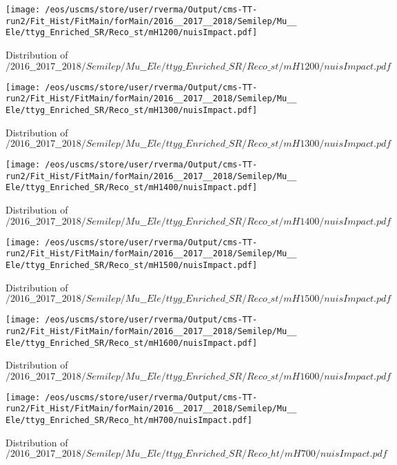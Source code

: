 \begin{figure}
\centering
\texttt{[image: /eos/uscms/store/user/rverma/Output/cms-TT-run2/Fit\_Hist/FitMain/forMain/2016\_\_2017\_\_2018/Semilep/Mu\_\_Ele/ttyg\_Enriched\_SR/Reco\_st/mH1200/nuisImpact.pdf]}
\caption{Distribution of $/2016\_\_2017\_\_2018/Semilep/Mu\_\_Ele/ttyg\_Enriched\_SR/Reco\_st/mH1200/nuisImpact.pdf$}
\end{figure}

\begin{figure}
\centering
\texttt{[image: /eos/uscms/store/user/rverma/Output/cms-TT-run2/Fit\_Hist/FitMain/forMain/2016\_\_2017\_\_2018/Semilep/Mu\_\_Ele/ttyg\_Enriched\_SR/Reco\_st/mH1300/nuisImpact.pdf]}
\caption{Distribution of $/2016\_\_2017\_\_2018/Semilep/Mu\_\_Ele/ttyg\_Enriched\_SR/Reco\_st/mH1300/nuisImpact.pdf$}
\end{figure}

\begin{figure}
\centering
\texttt{[image: /eos/uscms/store/user/rverma/Output/cms-TT-run2/Fit\_Hist/FitMain/forMain/2016\_\_2017\_\_2018/Semilep/Mu\_\_Ele/ttyg\_Enriched\_SR/Reco\_st/mH1400/nuisImpact.pdf]}
\caption{Distribution of $/2016\_\_2017\_\_2018/Semilep/Mu\_\_Ele/ttyg\_Enriched\_SR/Reco\_st/mH1400/nuisImpact.pdf$}
\end{figure}

\begin{figure}
\centering
\texttt{[image: /eos/uscms/store/user/rverma/Output/cms-TT-run2/Fit\_Hist/FitMain/forMain/2016\_\_2017\_\_2018/Semilep/Mu\_\_Ele/ttyg\_Enriched\_SR/Reco\_st/mH1500/nuisImpact.pdf]}
\caption{Distribution of $/2016\_\_2017\_\_2018/Semilep/Mu\_\_Ele/ttyg\_Enriched\_SR/Reco\_st/mH1500/nuisImpact.pdf$}
\end{figure}

\begin{figure}
\centering
\texttt{[image: /eos/uscms/store/user/rverma/Output/cms-TT-run2/Fit\_Hist/FitMain/forMain/2016\_\_2017\_\_2018/Semilep/Mu\_\_Ele/ttyg\_Enriched\_SR/Reco\_st/mH1600/nuisImpact.pdf]}
\caption{Distribution of $/2016\_\_2017\_\_2018/Semilep/Mu\_\_Ele/ttyg\_Enriched\_SR/Reco\_st/mH1600/nuisImpact.pdf$}
\end{figure}

\begin{figure}
\centering
\texttt{[image: /eos/uscms/store/user/rverma/Output/cms-TT-run2/Fit\_Hist/FitMain/forMain/2016\_\_2017\_\_2018/Semilep/Mu\_\_Ele/ttyg\_Enriched\_SR/Reco\_ht/mH700/nuisImpact.pdf]}
\caption{Distribution of $/2016\_\_2017\_\_2018/Semilep/Mu\_\_Ele/ttyg\_Enriched\_SR/Reco\_ht/mH700/nuisImpact.pdf$}
\end{figure}

